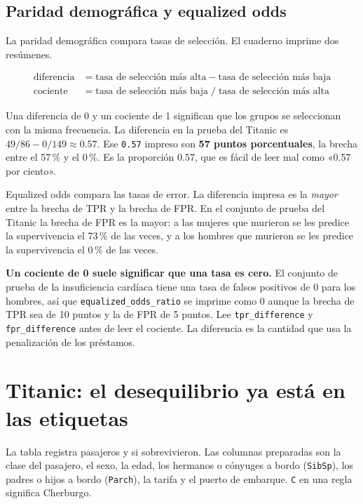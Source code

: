 \documentclass[11pt]{article}
\newcommand{\fn}[1]{\texttt{\small #1}}
\newcommand{\pct}[1]{\mbox{#1\,\%}}
\begin{document}
\subsection{Paridad demográfica y equalized odds}

La paridad demográfica compara tasas de selección. El cuaderno imprime dos resúmenes.

\[
\begin{aligned}
\text{diferencia} &= \text{tasa de selección más alta} - \text{tasa de selección más baja} \\
\text{cociente} &= \text{tasa de selección más baja} \;/\; \text{tasa de selección más alta}
\end{aligned}
\]

Una diferencia de 0 y un cociente de 1 significan que los grupos se seleccionan con la misma frecuencia. La diferencia en la prueba del Titanic es \(49/86 - 0/149 \approx 0.57\). Ese \fn{0.57} impreso son \textbf{57 puntos porcentuales}, la brecha entre el \pct{57} y el \pct{0}. Es la proporción \(0.57\), que es fácil de leer mal como «0.57 por ciento».

Equalized odds compara las tasas de error. La diferencia impresa es la \emph{mayor} entre la brecha de TPR y la brecha de FPR. En el conjunto de prueba del Titanic la brecha de FPR es la mayor: a las mujeres que murieron se les predice la supervivencia el \pct{73} de las veces, y a los hombres que murieron se les predice la supervivencia el \pct{0} de las veces.

\begin{careful}
\textbf{Un cociente de 0 suele significar que una tasa es cero.} El conjunto de prueba de la insuficiencia cardíaca tiene una tasa de falsos positivos de 0 para los hombres, así que \fn{equalized\_odds\_ratio} se imprime como 0 aunque la brecha de TPR sea de 10 puntos y la de FPR de 5 puntos. Lee \fn{tpr\_difference} y \fn{fpr\_difference} antes de leer el cociente. La diferencia es la cantidad que usa la penalización de los préstamos.
\end{careful}

\section{Titanic: el desequilibrio ya está en las etiquetas}
\label{sec:titanic}

La tabla registra pasajeros y si sobrevivieron. Las columnas preparadas son la clase del pasajero, el sexo, la edad, los hermanos o cónyuges a bordo (\fn{SibSp}), los padres o hijos a bordo (\fn{Parch}), la tarifa y el puerto de embarque. \fn{C} en una regla significa Cherburgo.
\end{document}
